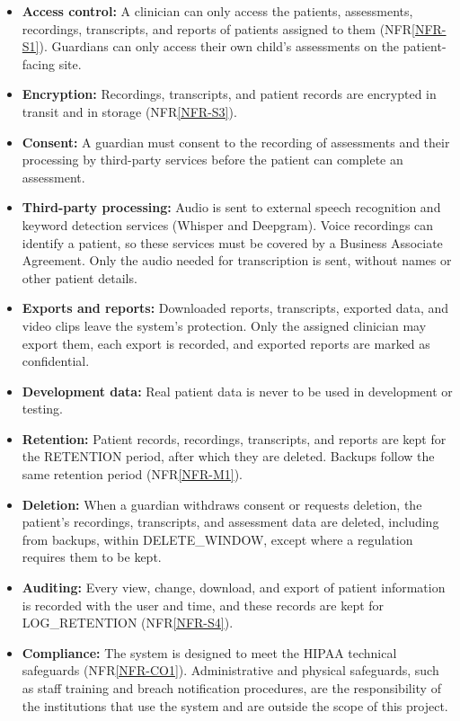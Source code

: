 \documentclass[12pt]{article}
\newcommand{\nfrref}[1]{NFR\ref{#1}}
\begin{document}
\begin{itemize}
  \item \textbf{Access control:} A clinician can only access the patients, assessments, recordings, transcripts, and reports of patients assigned to them (\nfrref{NFR-S1}). Guardians can only access their own child’s assessments on the patient-facing site.
  \item \textbf{Encryption:} Recordings, transcripts, and patient records are encrypted in transit and in storage (\nfrref{NFR-S3}). 
  \item \textbf{Consent:} A guardian must consent to the recording of assessments and their processing by third-party services before the patient can complete an assessment.
  \item \textbf{Third-party processing:} Audio is sent to external speech recognition and keyword detection services (Whisper and Deepgram). Voice recordings can identify a patient, so these services must be covered by a Business Associate Agreement. Only the audio needed for transcription is sent, without names or other patient details.
  \item \textbf{Exports and reports:} Downloaded reports, transcripts, exported data, and video clips leave the system’s protection. Only the assigned clinician may export them, each export is recorded, and exported reports are marked as confidential.
  \item \textbf{Development data:} Real patient data is never to be used in development or testing.
  \item \textbf{Retention:} Patient records, recordings, transcripts, and reports are kept for the RETENTION period, after which they are deleted. Backups follow the same retention period (\nfrref{NFR-M1}).
  \item \textbf{Deletion:} When a guardian withdraws consent or requests deletion, the patient’s recordings, transcripts, and assessment data are deleted, including from backups, within DELETE\_WINDOW, except where a regulation requires them to be kept.
  \item \textbf{Auditing:} Every view, change, download, and export of patient information is recorded with the user and time, and these records are kept for LOG\_RETENTION (\nfrref{NFR-S4}).
  \item \textbf{Compliance:} The system is designed to meet the HIPAA technical safeguards (\nfrref{NFR-CO1}). Administrative and physical safeguards, such as staff training and breach notification procedures, are the responsibility of the institutions that use the system and are outside the scope of this project.
\end{itemize}
\end{document}
